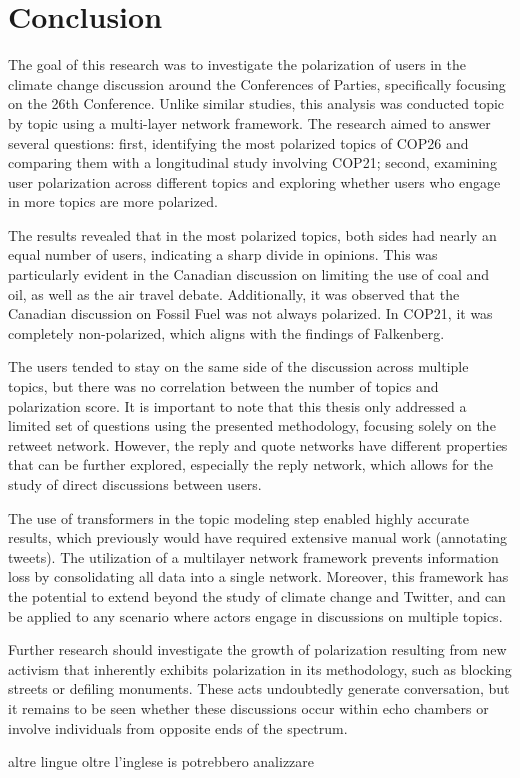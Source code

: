 \chapter{Conclusion}
\label{ch:conclusion}
The goal of this research was to investigate the polarization of users in the climate change discussion around the Conferences of Parties, specifically focusing on the 26th Conference. Unlike similar studies, this analysis was conducted topic by topic using a multi-layer network framework. The research aimed to answer several questions: first, identifying the most polarized topics of COP26 and comparing them with a longitudinal study involving COP21; second, examining user polarization across different topics and exploring whether users who engage in more topics are more polarized.

The results revealed that in the most polarized topics, both sides had nearly an equal number of users, indicating a sharp divide in opinions. This was particularly evident in the Canadian discussion on limiting the use of coal and oil, as well as the air travel debate. Additionally, it was observed that the Canadian discussion on Fossil Fuel was not always polarized. In COP21, it was completely non-polarized, which aligns with the findings of Falkenberg.

The users tended to stay on the same side of the discussion across multiple topics, but there was no correlation between the number of topics and polarization score. It is important to note that this thesis only addressed a limited set of questions using the presented methodology, focusing solely on the retweet network. However, the reply and quote networks have different properties that can be further explored, especially the reply network, which allows for the study of direct discussions between users.

The use of transformers in the topic modeling step enabled highly accurate results, which previously would have required extensive manual work (annotating tweets). The utilization of a multilayer network framework prevents information loss by consolidating all data into a single network. Moreover, this framework has the potential to extend beyond the study of climate change and Twitter, and can be applied to any scenario where actors engage in discussions on multiple topics.

Further research should investigate the growth of polarization resulting from new activism that inherently exhibits polarization in its methodology, such as blocking streets or defiling monuments. These acts undoubtedly generate conversation, but it remains to be seen whether these discussions occur within echo chambers or involve individuals from opposite ends of the spectrum.


altre lingue oltre l'inglese is potrebbero analizzare 


